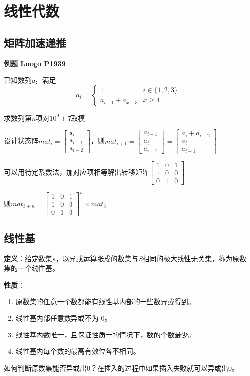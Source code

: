 \section{线性代数}

\subsection{矩阵加速递推}

\textbf{例题 Luogo P1939}

已知数列$a$，满足
\[
a_i=\left\{\begin{matrix}
               1 & i\in \{1,2,3\}\\
               a_{i-1}+a_{x-3}& x\ge 4
\end{matrix}\right.
\]

求数列第$n$项对$10^9+7$取模

设计状态阵$mat_i=\begin{bmatrix}
                     a_i \\
                     a_{i-1}\\
                     a_{i-2}
\end{bmatrix}$，则$mat_{i+1}=\begin{bmatrix}a_{i+1}\\a_{i}\\a_{i-1}\end{bmatrix}=\begin{bmatrix}a_{i}+a_{i-2}\\a_{i}\\a_{i-1}\end{bmatrix}$

可以用待定系数法，加对应项相等解出转移矩阵$\begin{bmatrix}1&0&1\\1&0&0\\0&1&0\end{bmatrix}$

则$mat_{3+n}=\begin{bmatrix}1&0&1\\1&0&0\\0&1&0\end{bmatrix}^n\times mat_3$

\subsection{线性基}

\textbf{定义}：给定数集$s$，以异或运算张成的数集与$S$相同的极大线性无关集，称为原数集的一个线性基。

\textbf{性质}：

\begin{enumerate}
    \item 原数集的任意一个数都能有线性基内部的一些数异或得到。
    \item 线性基内部任意数异或不为 0。
    \item 线性基内数唯一，且保证性质一的情况下，数的个数最少。
    \item 线性基内每个数的最高有效位各不相同。
\end{enumerate}


如何判断原数集能否异或出$0$？在插入的过程中如果插入失败就可以异或出$0$。

